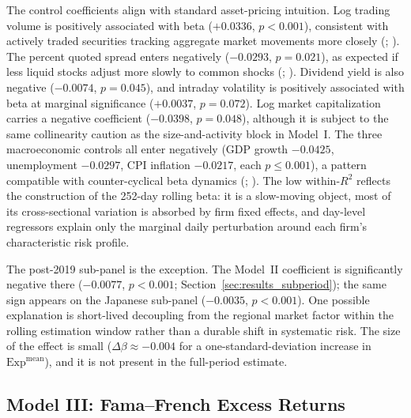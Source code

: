 \documentclass{article}
\theoremstyle{plain}
\begin{document}


The control coefficients align with standard asset-pricing intuition. Log trading volume is positively associated with beta ($+0.0336$, $p<0.001$), consistent with actively traded securities tracking aggregate market movements more closely (\cite{chordia2000commonality}; \cite{AmihudMendelson1986}). The percent quoted spread enters negatively ($-0.0293$, $p=0.021$), as expected if less liquid stocks adjust more slowly to common shocks (\cite{Hasbrouck1991}; \cite{stoll2000friction}). Dividend yield is also negative ($-0.0074$, $p=0.045$), and intraday volatility is positively associated with beta at marginal significance ($+0.0037$, $p=0.072$). Log market capitalization carries a negative coefficient ($-0.0398$, $p=0.048$), although it is subject to the same collinearity caution as the size-and-activity block in Model~I. The three macroeconomic controls all enter negatively (GDP growth $-0.0425$, unemployment $-0.0297$, CPI inflation $-0.0217$, each $p\leq 0.001$), a pattern compatible with counter-cyclical beta dynamics (\cite{StockWatson2002}; \cite{BakerBloomDavis2016}). The low within-$R^2$ reflects the construction of the 252-day rolling beta: it is a slow-moving object, most of its cross-sectional variation is absorbed by firm fixed effects, and day-level regressors explain only the marginal daily perturbation around each firm's characteristic risk profile.

The post-2019 sub-panel is the exception. The Model~II coefficient is significantly negative there ($-0.0077$, $p<0.001$; Section~\ref{sec:results_subperiod}); the same sign appears on the Japanese sub-panel ($-0.0035$, $p<0.001$). One possible explanation is short-lived decoupling from the regional market factor within the rolling estimation window rather than a durable shift in systematic risk. The size of the effect is small ($\Delta\beta \approx -0.004$ for a one-standard-deviation increase in $\mathrm{Exp}^{\text{mean}}$), and it is not present in the full-period estimate.

\subsection{Model III: Fama--French Excess Returns}
\label{sec:results_modelIII}
\end{document}
